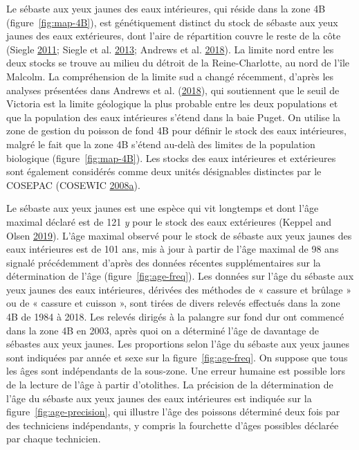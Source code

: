 \documentclass[11pt]{book}
\begin{document}
\setlength{\parindent}{0in} \setlength{\leftskip}{0in} \setlength{\parskip}{4pt}

\clearpage

\Appendices


\clearpage

\label{app:biological-data}

Le sébaste aux yeux jaunes des eaux intérieures, qui réside dans la zone 4B (figure~\ref{fig:map-4B}), est génétiquement distinct du stock de sébaste aux yeux jaunes des eaux extérieures, dont l'aire de répartition couvre le reste de la côte (Siegle \protect\hyperlink{ref-siegle2011}{2011}; Siegle et al. \protect\hyperlink{ref-siegle2013}{2013}; Andrews et al. \protect\hyperlink{ref-andrews2018}{2018}). La limite nord entre les deux stocks se trouve au milieu du détroit de la Reine-Charlotte, au nord de l'île Malcolm. La compréhension de la limite sud a changé récemment, d'après les analyses présentées dans Andrews et al. (\protect\hyperlink{ref-andrews2018}{2018}), qui soutiennent que le seuil de Victoria est la limite géologique la plus probable entre les deux populations et que la population des eaux intérieures s'étend dans la baie Puget. On utilise la zone de gestion du poisson de fond 4B pour définir le stock des eaux intérieures, malgré le fait que la zone 4B s'étend au-delà des limites de la population biologique (figure~\ref{fig:map-4B}). Les stocks des eaux intérieures et extérieures sont également considérés comme deux unités désignables distinctes par le COSEPAC (COSEWIC \protect\hyperlink{ref-cosewic2008}{2008}\protect\hyperlink{ref-cosewic2008}{a}).

\hypertarget{sec:growth}{%
\label{sec:growth}}

Le sébaste aux yeux jaunes est une espèce qui vit longtemps et dont l'âge maximal déclaré est de 121 \emph{y} pour le stock des eaux extérieures (Keppel and Olsen \protect\hyperlink{ref-keppel2019}{2019}). L'âge maximal observé pour le stock de sébaste aux yeux jaunes des eaux intérieures est de 101 ans, mis à jour à partir de l'âge maximal de 98 ans signalé précédemment d'après des données récentes supplémentaires sur la détermination de l'âge (figure~\ref{fig:age-freq}). Les données sur l'âge du sébaste aux yeux jaunes des eaux intérieures, dérivées des méthodes de « cassure et brûlage » ou de « cassure et cuisson », sont tirées de divers relevés effectués dans la zone 4B de 1984 à 2018. Les relevés dirigés à la palangre sur fond dur ont commencé dans la zone 4B en 2003, après quoi on a déterminé l'âge de davantage de sébastes aux yeux jaunes. Les proportions selon l'âge du sébaste aux yeux jaunes sont indiquées par année et sexe sur la figure~\ref{fig:age-freq}. On suppose que tous les âges sont indépendants de la sous-zone. Une erreur humaine est possible lors de la lecture de l'âge à partir d'otolithes. La précision de la détermination de l'âge du sébaste aux yeux jaunes des eaux intérieures est indiquée sur la figure~\ref{fig:age-precision}, qui illustre l'âge des poissons déterminé deux fois par des techniciens indépendants, y compris la fourchette d'âges possibles déclarée par chaque technicien.
\end{document}
